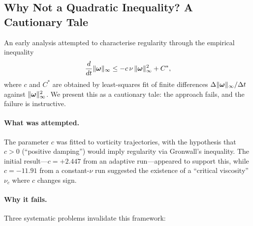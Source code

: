 \subsection{Why Not a Quadratic Inequality?
  A Cautionary Tale}\label{app:ns:quadratic}

An early analysis attempted to characterise regularity
through the empirical inequality
\begin{equation}\label{eq:app_ineq}
  \frac{d}{dt}\lVert \bm{\omega} \rVert_\infty
  \le -c\,\nu\,\lVert \bm{\omega} \rVert_\infty^2 + C^*,
\end{equation}
where $c$ and $C^*$ are obtained by least-squares fit of
finite differences $\Delta\lVert \bm{\omega} \rVert_\infty/\Delta t$
against $\lVert \bm{\omega} \rVert_\infty^2$.  We present this as a
cautionary tale: the approach fails, and the failure is
instructive.

\paragraph{What was attempted.}
The parameter $c$ was fitted to vorticity trajectories,
with the hypothesis that $c > 0$ (``positive damping'')
would imply regularity via Gronwall's inequality.
The initial result---$c = +2.447$ from an adaptive run---appeared
to support this, while $c = -11.91$ from a constant-$\nu$ run
suggested the existence of a ``critical viscosity'' $\nu_c$
where $c$ changes sign.

\paragraph{Why it fails.}
Three systematic problems invalidate this framework:

